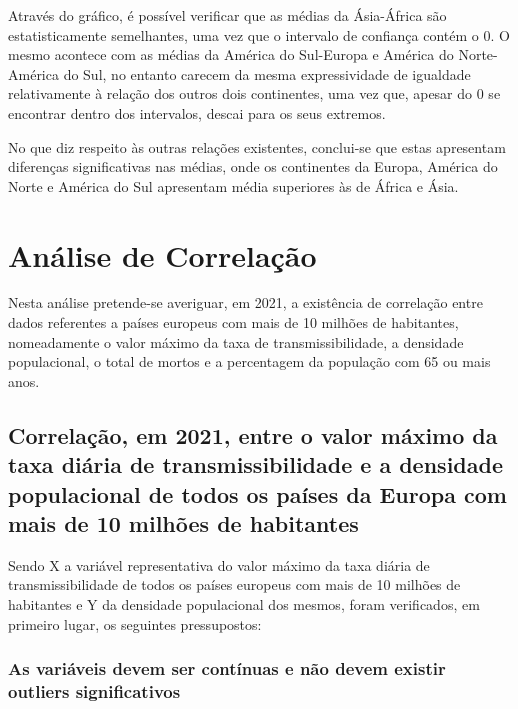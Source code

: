 \documentclass[conference]{IEEEtran}
\begin{document}
Através do gráfico, é possível verificar que as médias da Ásia-África são estatisticamente semelhantes, uma vez que o intervalo de confiança contém o 0. O mesmo acontece com as médias da América do Sul-Europa e América do Norte-América do Sul, no entanto carecem da mesma expressividade de igualdade relativamente à relação dos outros dois continentes, uma vez que, apesar do 0 se encontrar dentro dos intervalos, descai para os seus extremos.

No que diz respeito às outras relações existentes, conclui-se que estas apresentam diferenças significativas nas médias, onde os continentes da Europa, América do Norte e América do Sul apresentam média superiores às de África e Ásia.


\section{Análise de Correlação} %
Nesta análise pretende-se averiguar, em 2021, a existência de correlação entre dados referentes a países europeus com mais de 10 milhões de habitantes, nomeadamente o valor máximo da taxa de transmissibilidade, a densidade populacional, o total de mortos e a percentagem da população com 65 ou mais anos.

\subsection{Correlação, em 2021, entre o valor máximo da taxa diária de transmissibilidade e a densidade populacional de todos os países da Europa com mais de 10 milhões de habitantes}

Sendo X a variável representativa do valor máximo da taxa diária de transmissibilidade de todos os países europeus com mais de 10 milhões de habitantes e Y da densidade populacional dos mesmos, foram verificados, em primeiro lugar, os seguintes pressupostos:

\subsubsection{As variáveis devem ser contínuas e não devem existir outliers significativos}
\end{document}
